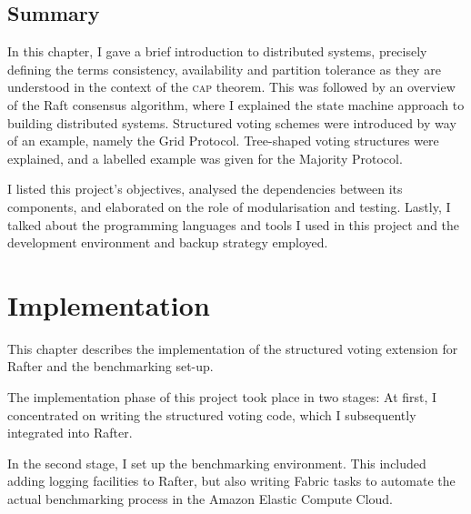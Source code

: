 \documentclass[11pt,chapterprefix=true,toc=bibliography,numbers=noendperiod,
               footnotes=multiple,twoside]{scrreprt}
\begin{document}
\section{Summary}

In this chapter, I gave a brief introduction to distributed systems, precisely defining the terms consistency, availability and partition tolerance as they are understood in the context of the \textsc{cap} theorem. This was followed by an overview of the Raft consensus algorithm, where I explained the state machine approach to building distributed systems. Structured voting schemes were introduced by way of an example, namely the Grid Protocol. Tree-shaped voting structures were explained, and a labelled example was given for the Majority Protocol.

I listed this project's objectives, analysed the dependencies between its components, and elaborated on the role of modularisation and testing. Lastly, I talked about the programming languages and tools I used in this project and the development environment and backup strategy employed.



\chapter{Implementation\label{ch:implementation}}


This chapter describes the implementation of the structured voting extension for Rafter and the benchmarking set-up.

The implementation phase of this project took place in two stages: At first, I concentrated on writing the structured voting code, which I subsequently integrated into Rafter.

In the second stage, I set up the benchmarking environment. This included adding logging facilities to Rafter, but also writing Fabric tasks to automate the actual benchmarking process in the Amazon Elastic Compute Cloud.
\end{document}
